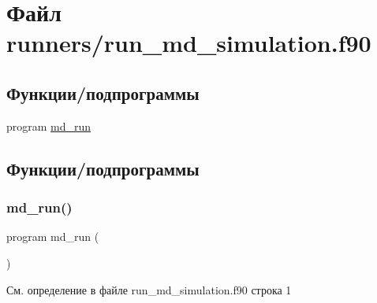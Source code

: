 \hypertarget{run__md__simulation_8f90}{}\section{Файл runners/run\+\_\+md\+\_\+simulation.f90}
\label{run__md__simulation_8f90}
\subsection*{Функции/подпрограммы}
\begin{DoxyCompactItemize}
\item 
program \mbox{\hyperlink{run__md__simulation_8f90_a046456b29e3157bccd7d9d4e3c5f6b43}{md\+\_\+run}}
\end{DoxyCompactItemize}


\subsection{Функции/подпрограммы}
\mbox{\label{run__md__simulation_8f90_a046456b29e3157bccd7d9d4e3c5f6b43}} 
\subsubsection{\texorpdfstring{md\+\_\+run()}{md\_run()}}
{\footnotesize\ttfamily program md\+\_\+run (\begin{DoxyParamCaption}{ }\end{DoxyParamCaption})}



См. определение в файле run\+\_\+md\+\_\+simulation.\+f90 строка 1

